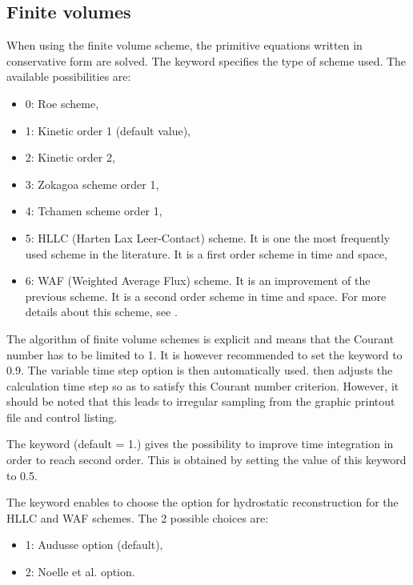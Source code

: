 \subsection{Finite volumes}
When using the finite volume scheme, the primitive equations written
in conservative form are solved.
The keyword  specifies the type of scheme used.
The available possibilities are:

\begin{itemize}
\item 0: Roe scheme,

\item 1: Kinetic order 1 (default value),

\item 2: Kinetic order 2,

\item 3: Zokagoa scheme order 1,

\item 4: Tchamen scheme order 1,

\item 5: HLLC (Harten Lax Leer-Contact) scheme.
It is one the most frequently used scheme in the literature.
It is a first order scheme in time and space,

\item 6: WAF (Weighted Average Flux) scheme.
It is an improvement of the previous scheme.
It is a second order scheme in time and space.
For more details about this scheme, see \cite{Ata2012}.
\end{itemize}

The algorithm of finite volume schemes is explicit and means that
the Courant number has to be limited to 1.
It is however recommended to set the keyword 
to 0.9.
The variable time step option is then automatically used.
 then adjusts the calculation time step so as to satisfy
this Courant number criterion.
However, it should be noted that this leads to irregular sampling
from the graphic printout file and control listing.

The keyword  (default = 1.) gives
the possibility to improve time integration in order to reach second order.
This is obtained by setting the value of this keyword to 0.5.

The keyword 
enables to choose the option for hydrostatic reconstruction for the
HLLC and WAF schemes.
The 2 possible choices are:
\begin{itemize}
\item 1: Audusse option (default),
\item 2: Noelle et al. option.
\end{itemize}


